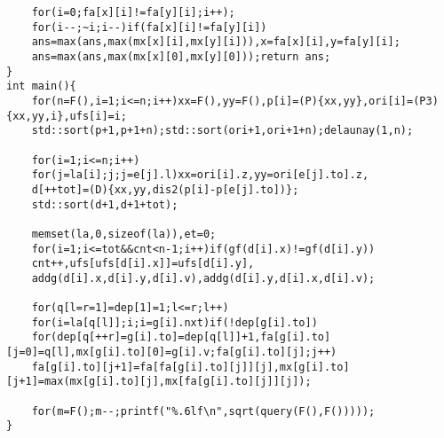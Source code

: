 \documentclass{article}
\begin{document}
\begin{lstlisting}
    for(i=0;fa[x][i]!=fa[y][i];i++);
    for(i--;~i;i--)if(fa[x][i]!=fa[y][i])
    ans=max(ans,max(mx[x][i],mx[y][i])),x=fa[x][i],y=fa[y][i];
    ans=max(ans,max(mx[x][0],mx[y][0]));return ans;
}
int main(){
    for(n=F(),i=1;i<=n;i++)xx=F(),yy=F(),p[i]=(P){xx,yy},ori[i]=(P3){xx,yy,i},ufs[i]=i;
    std::sort(p+1,p+1+n);std::sort(ori+1,ori+1+n);delaunay(1,n);
     
    for(i=1;i<=n;i++)
    for(j=la[i];j;j=e[j].l)xx=ori[i].z,yy=ori[e[j].to].z,
    d[++tot]=(D){xx,yy,dis2(p[i]-p[e[j].to])};
    std::sort(d+1,d+1+tot);
     
    memset(la,0,sizeof(la)),et=0;
    for(i=1;i<=tot&&cnt<n-1;i++)if(gf(d[i].x)!=gf(d[i].y))
    cnt++,ufs[ufs[d[i].x]]=ufs[d[i].y],
    addg(d[i].x,d[i].y,d[i].v),addg(d[i].y,d[i].x,d[i].v);
     
    for(q[l=r=1]=dep[1]=1;l<=r;l++)
    for(i=la[q[l]];i;i=g[i].nxt)if(!dep[g[i].to])
    for(dep[q[++r]=g[i].to]=dep[q[l]]+1,fa[g[i].to][j=0]=q[l],mx[g[i].to][0]=g[i].v;fa[g[i].to][j];j++)
    fa[g[i].to][j+1]=fa[fa[g[i].to][j]][j],mx[g[i].to][j+1]=max(mx[g[i].to][j],mx[fa[g[i].to][j]][j]);
     
    for(m=F();m--;printf("%.6lf\n",sqrt(query(F(),F()))));
}
\end{lstlisting}
\end{document}
